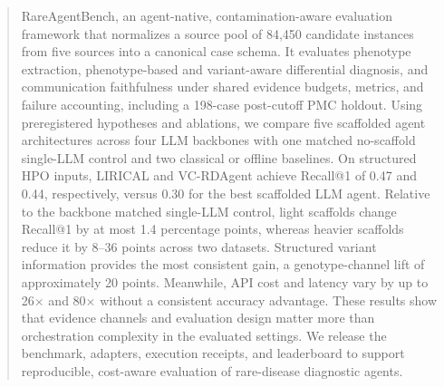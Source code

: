 \documentclass[letterpaper]{article} %
\begin{document}
\begin{abstract}
RareAgentBench, an agent-native, contamination-aware evaluation framework that normalizes a source pool of 84,450 candidate instances from five sources into a canonical case schema. It evaluates phenotype extraction, phenotype-based and variant-aware differential diagnosis, and communication faithfulness under shared evidence budgets, metrics, and failure accounting, including a 198-case post-cutoff PMC holdout. Using preregistered hypotheses and ablations, we compare five scaffolded agent architectures across four LLM backbones with one matched no-scaffold single-LLM control and two classical or offline baselines. On structured HPO inputs, LIRICAL and VC-RDAgent achieve Recall@1 of 0.47 and 0.44, respectively, versus 0.30 for the best scaffolded LLM agent. Relative to the backbone matched single-LLM control, light scaffolds change Recall@1 by at most 1.4 percentage points, whereas heavier scaffolds reduce it by 8--36 points across two datasets. Structured variant information provides the most consistent gain, a genotype-channel lift of approximately 20 points. Meanwhile, API cost and latency vary by up to 26$\times$ and 80$\times$ without a consistent accuracy advantage. These results show that evidence channels and evaluation design matter more than orchestration complexity in the evaluated settings. We release the benchmark, adapters, execution receipts, and leaderboard to support reproducible, cost-aware evaluation of rare-disease diagnostic agents.
\end{abstract}



\end{document}
